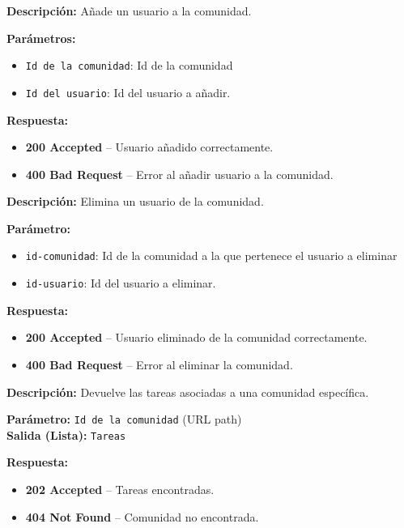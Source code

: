 \begin{tcolorbox}[title=\texttt{POST /comunidades/\{id-comunidad\}/usuarios/\{id-usuario\}/}, colback=blue!5, colframe=blue!80!black]
\textbf{Descripción:} Añade un usuario a la comunidad.

\textbf{Parámetros:}
\begin{itemize}[label=--]
    \item \texttt{Id de la comunidad}: Id de la comunidad
    \item \texttt{Id del usuario}: Id del usuario a añadir.
\end{itemize}

\textbf{Respuesta:}
\begin{itemize}[label=--]
    \item \textbf{200 Accepted} – Usuario añadido correctamente.
    \item \textbf{400 Bad Request} – Error al añadir usuario a la comunidad.
\end{itemize}
\end{tcolorbox}


\begin{tcolorbox}[title=\texttt{DELETE /comunidades/\{id-comunidad\}/usuarios/\{id-usuario\}}, colback=blue!5, colframe=blue!80!black]
\textbf{Descripción:} Elimina un usuario de la comunidad.

\textbf{Parámetro:}
\begin{itemize}[label=--]
    \item \texttt{id-comunidad}: Id de la comunidad a la que pertenece el usuario a eliminar
    \item \texttt{id-usuario}: Id del usuario a eliminar.
\end{itemize}

\textbf{Respuesta:}
\begin{itemize}[label=--]
    \item \textbf{200 Accepted} – Usuario eliminado de la comunidad correctamente.
    \item \textbf{400 Bad Request} – Error al eliminar la comunidad.
\end{itemize}
\end{tcolorbox}

\begin{tcolorbox}[title=\texttt{GET /comunidades/\{id-comunidad\}/tareas}, colback=blue!5, colframe=blue!80!black]
\textbf{Descripción:} Devuelve las tareas asociadas a una comunidad específica.

\textbf{Parámetro:} \texttt{Id de la comunidad} (URL path) \\
\textbf{Salida (Lista):} \texttt{Tareas}

\textbf{Respuesta:}
\begin{itemize}[label=--]
    \item \textbf{202 Accepted} – Tareas encontradas.
    \item \textbf{404 Not Found} – Comunidad no encontrada.
\end{itemize}
\end{tcolorbox}

